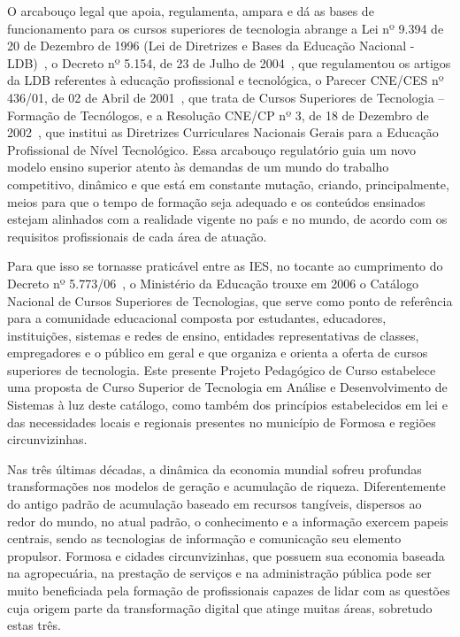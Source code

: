 \documentclass[
	10pt,				%
	openright,			%
	twoside,			%
	a4paper,			%
	english,			%
	french,				%
	brazil,				%
	sumario=tradicional
]{abntex2}
\begin{document}
O arcabouço legal que apoia, regulamenta, ampara e dá as bases de funcionamento para os cursos superiores de tecnologia abrange a Lei nº 9.394 de 20 de Dezembro de 1996 (Lei de Diretrizes e Bases da Educação Nacional - LDB)~\cite{Lei19394De1996}, o Decreto nº 5.154, de 23 de Julho de 2004~\cite{Decreto5154De2004}, que regulamentou os artigos da LDB referentes à educação profissional e tecnológica, o Parecer CNE/CES nº 436/01, de 02 de Abril de 2001~\cite{ParacerCNES435De2011}, que trata de Cursos Superiores de Tecnologia – Formação de Tecnólogos, e a Resolução CNE/CP nº 3, de 18 de Dezembro de 2002~\cite{Resolucao03De2002}, que institui as Diretrizes Curriculares Nacionais Gerais para a Educação Profissional de Nível Tecnológico. 
Essa arcabouço regulatório guia um novo modelo ensino superior atento às demandas de um mundo do trabalho competitivo, dinâmico e que está em constante mutação, criando, principalmente, meios para que o tempo de formação seja adequado e os conteúdos ensinados estejam alinhados com a realidade vigente no país e no mundo, de acordo com os requisitos profissionais de cada área de atuação. 

Para que isso se tornasse praticável entre as IES, no tocante ao cumprimento do Decreto nº 5.773/06~\cite{Decreto5773De2006}, o Ministério da Educação trouxe em 2006 o Catálogo Nacional de Cursos Superiores de Tecnologias, que serve como ponto de referência para a comunidade educacional composta por estudantes, educadores, instituições, sistemas e redes de ensino, entidades representativas de classes, empregadores e o público em geral e que  organiza e orienta a oferta de cursos superiores de tecnologia. Este presente Projeto Pedagógico de Curso estabelece uma proposta de Curso Superior de Tecnologia em Análise e Desenvolvimento de Sistemas à luz deste catálogo, como também dos princípios estabelecidos em lei e das necessidades locais e regionais presentes no município de Formosa e regiões circunvizinhas.

Nas três últimas décadas, a dinâmica da economia mundial sofreu profundas transformações nos modelos de geração e acumulação de riqueza. Diferentemente do antigo padrão de acumulação baseado
em recursos tangíveis, dispersos ao redor do mundo, no atual padrão, o conhecimento e a informação exercem papeis centrais, sendo as tecnologias de informação e comunicação seu elemento propulsor. Formosa e cidades circunvizinhas, que possuem sua economia baseada na agropecuária, na prestação de serviços e na administração pública pode ser muito beneficiada pela formação de profissionais capazes de lidar com as questões cuja origem parte da transformação digital que atinge muitas áreas, sobretudo estas três.
\end{document}
